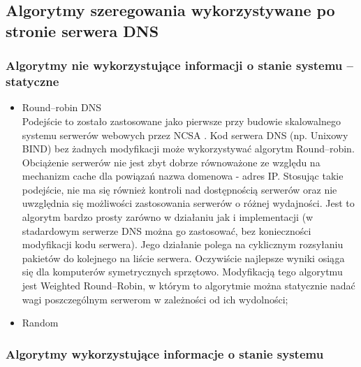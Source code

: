 \subsection{Algorytmy szeregowania wykorzystywane po stronie serwera DNS}

\subsubsection{Algorytmy nie wykorzystujące informacji o stanie systemu -- statyczne}

\begin{itemize}
\item Round--robin DNS\\
Podejście to zostało zastosowane jako pierwsze przy budowie skalowalnego systemu serwerów webowych przez NCSA \cite{modele22}. Kod 
serwera DNS (np. Unixowy BIND) bez żadnych modyfikacji może wykorzystywać algorytm Round--robin. Obciążenie serwerów nie jest 
zbyt dobrze 
równoważone ze względu na mechanizm cache dla powiązań nazwa domenowa - adres IP. Stosując takie podejście, nie ma się również 
kontroli nad dostępnością serwerów oraz nie uwzględnia się możliwości zastosowania serwerów o różnej wydajności.
Jest to algorytm bardzo prosty zarówno w działaniu jak i implementacji (w stadardowym serwerze DNS można go zastosować, bez
konieczności modyfikacji kodu serwera). Jego działanie polega na cyklicznym rozsyłaniu pakietów do kolejnego na liście serwera.
Oczywiście najlepsze wyniki osiąga się dla komputerów symetrycznych sprzętowo. Modyfikacją tego algorytmu jest 
Weighted Round--Robin, w którym to algorytmie można statycznie nadać wagi poszczególnym serwerom w zależności od ich 
wydolności;
\item Random\\
\end{itemize}

\subsubsection{Algorytmy wykorzystujące informacje o stanie systemu}


